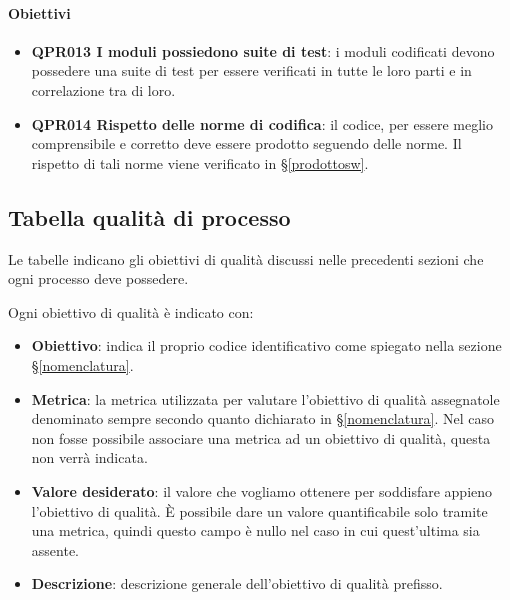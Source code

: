         \paragraph*{Obiettivi}
        \begin{itemize}
            \item \textbf{QPR013 I moduli possiedono suite di test}: i moduli codificati devono possedere una suite di test per essere verificati in tutte le loro parti e in correlazione tra di loro.
            \item \textbf{QPR014 Rispetto delle norme di codifica}: il codice, per essere meglio comprensibile e corretto deve essere prodotto seguendo delle norme. Il rispetto di tali norme viene verificato in \S\ref{prodottosw}.
        \end{itemize}

\subsection{Tabella qualità di processo}
Le tabelle indicano gli obiettivi di qualità discussi nelle precedenti sezioni che ogni processo deve possedere.

Ogni obiettivo di qualità è indicato con:

\begin{itemize}
	\item \textbf{Obiettivo}: indica il proprio codice identificativo come spiegato nella sezione \S\ref{nomenclatura}.
	\item \textbf{Metrica}: la metrica utilizzata per valutare l'obiettivo di qualità assegnatole denominato sempre secondo quanto dichiarato in \S\ref{nomenclatura}. Nel caso non fosse possibile associare una metrica ad un obiettivo di qualità, questa non verrà indicata.
	\item \textbf{Valore desiderato}: il valore che vogliamo ottenere per soddisfare appieno l'obiettivo di qualità. È possibile dare un valore quantificabile solo tramite una metrica, quindi questo campo è nullo nel caso in cui quest'ultima sia assente.
	\item \textbf{Descrizione}: descrizione generale dell'obiettivo di qualità prefisso.
\end{itemize}

\newcommand{\grigiodesc}{gray!15}


